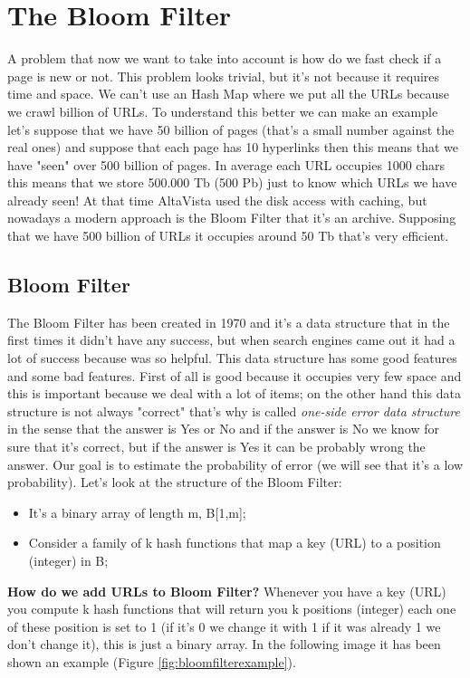 \chapter{The Bloom Filter}
A problem that now we want to take into account is how do we fast check if a page is new or not. This problem looks trivial, but it's not because it requires time and space. We can't use an Hash Map where we put all the URLs because we crawl billion of URLs. To understand this better we can make an example let's suppose that we have 50 billion of pages (that's a small number against the real ones) and suppose that each page has 10 hyperlinks then this means that we have "seen" over 500 billion of pages. In average each URL occupies 1000 chars this means that we store 500.000 Tb (500 Pb) just to know which URLs we have already seen!\newline
At that time AltaVista used the disk access with caching, but nowadays a modern approach is the Bloom Filter that it's an archive. Supposing that we have 500 billion of URLs it occupies around 50 Tb that's very efficient.\newline
\section{Bloom Filter}
The Bloom Filter has been created in 1970 and it's a data structure that in the first times it didn't have any success, but when search engines came out it had a lot of success because was so helpful. This data structure has some good features and some bad features. First of all is good because it occupies very few space and this is important because we deal with a lot of items; on the other hand this data structure is not always "correct" that's why is called \textit{one-side error data structure} in the sense that the answer is Yes or No and if the answer is No we know for sure that it's correct, but if the answer is Yes it can be probably wrong the answer. Our goal is to estimate the probability of error (we will see that it's a low probability).\newline
Let's look at the structure of the Bloom Filter:
\begin{itemize}
    \item It's a binary array of length m, B[1,m];
    \item Consider a family of k hash functions that map a key (URL) to a position (integer) in B;
\end{itemize}
\textbf{How do we add URLs to Bloom Filter?} Whenever you have a key (URL) you compute k hash functions that will return you k positions (integer) each one of these position is set to 1 (if it's 0 we change it with 1 if it was already 1 we don't change it), this is just a binary array. In the following image it has been shown an example (Figure \ref{fig:bloomfilterexample}).


